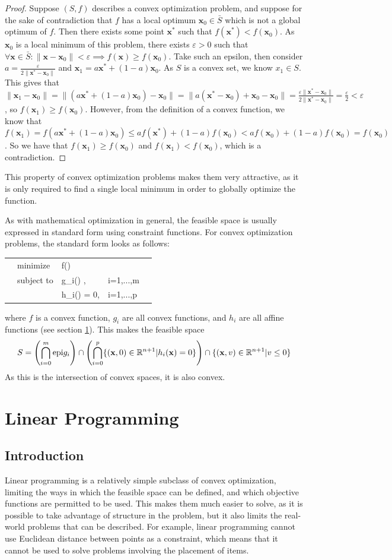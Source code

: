 \documentclass[10pt]{article}
\renewcommand{\vec}[1]{\mathbf{#1}}
\newcommand{\R}[1][]{ \ifx&#1& \mathbb{R} \else \mathbb{R}^{#1} \fi }
\newcommand{\epi}[2][]{\ifx&#1& \mathrm{epi}#2 \else \textrm{epi}_{#1}#2 \fi }
\newcommand{\affcomb}[3][a]{#1#2 + (1-#1)#3}
\newcommand{\x}{\vec{x}}
\begin{document}
\begin{proof}
	Suppose $(S,f)$ describes a convex optimization problem, and suppose for the sake of contradiction that $f$ has a local optimum $\x_0\in\bar{S}$ which is not a global optimum of $f$. Then there exists some point $\x^*$ such that $f(\x^*) < f(\x_0)$. As $\x_0$ is a local minimum of this problem, there exists $\varepsilon>0$ such that $\forall \x\in \bar{S}:\lVert \x-\x_0\rVert < \varepsilon\implies f(\x)\geq f(\x_0)$. Take such an epsilon, then consider $a = \frac{\varepsilon}{2\lVert\x^*-\x_0\rVert}$ and $\x_1=\affcomb{\x^*}{\x_0}$. As $S$ is a convex set, we know $x_1\in S$. This gives that $\lVert\x_1-\x_0\rVert = \lVert(\affcomb{\x^*}{\x_0}) - \x_0\rVert = \lVert a(\x^*-\x_0) + \x_0 - \x_0\lVert = \frac{\varepsilon\lVert\x^*-\x_0\rVert}{2\lVert\x^*-\x_0\rVert} = \frac{\varepsilon}{2} < \varepsilon$, so $f(\x_1) \geq f(\x_0)$. However, from the definition of a convex function, we know that $f(\x_1) = f(\affcomb{\x^*}{\x_0}) \leq\affcomb{f(\x^*)}{f(\x_0)}<\affcomb{f(\x_0)}{f(\x_0)}=f(\x_0)$. So we have that $f(\x_1) \geq f(\x_0)$ and $f(\x_1) < f(\x_0)$, which is a contradiction. 
\end{proof}
This property of convex optimization problems makes them very attractive, as it is only required to find a single local minimum in order to globally optimize the function.

As with mathematical optimization in general, the feasible space is usually expressed in standard form using constraint functions\cite{boyd}. For convex optimization problems, the standard form looks as follows:
\\
\begin{tabularx}{\textwidth}{X l L L X}
	& minimize		& f(\x) 			& 			& \\
	& subject to	& g_i(\x) ,	& i=1,...,m	& \\
	&				& h_i(\x) = 0,		& i=1,...,p &
\end{tabularx}
where $f$ is a convex function, $g_i$ are all convex functions, and $h_i$ are all affine functions (see section \ref{lp}). This makes the feasible space \[
S = \left(\bigcap\limits_{i=0}^{m} \epi{g_i}\right)\cap\left(\bigcap\limits_{i=0}^{p} \{(\x,0)\in\R[n+1]|h_i(\x)=0\}\right)\cap\{(\x,v)\in\R[n+1]|v\leq 0\}
\]
As this is the intersection of convex spaces, it is also convex.
\section{Linear Programming}
\label{lp}
\subsection{Introduction}
Linear programming is a relatively simple subclass of convex optimization, limiting the ways in which the feasible space can be defined, and which objective functions are permitted to be used. This makes them much easier to solve, as it is possible to take advantage of structure in the problem, but it also limits the real-world problems that can be described. For example, linear programming cannot use Euclidean distance between points as a constraint, which means that it cannot be used to solve problems involving the placement of items. 
\end{document}
